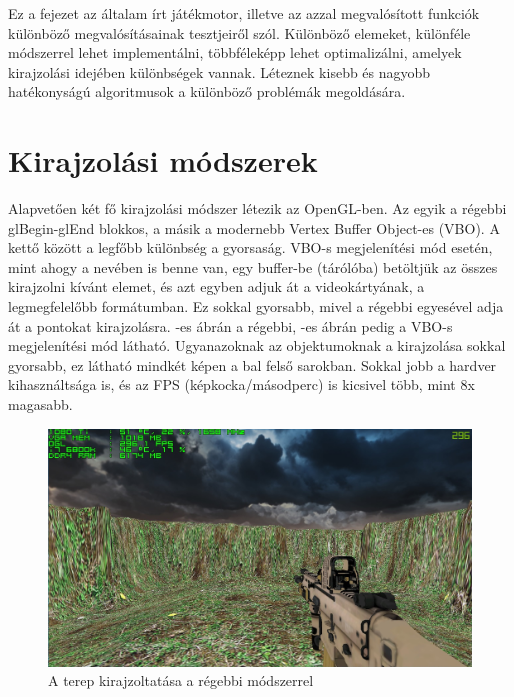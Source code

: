 \label{Chap:tesztek}


Ez a fejezet az általam írt játékmotor, illetve az azzal megvalósított funkciók különböző megvalósításainak tesztjeiről szól. Különböző elemeket, különféle módszerrel lehet implementálni, többféleképp lehet optimalizálni, amelyek kirajzolási idejében különbségek vannak. Léteznek kisebb és nagyobb hatékonyságú algoritmusok a különböző problémák megoldására.

\section{Kirajzolási módszerek}

Alapvetően két fő kirajzolási módszer létezik az OpenGL-ben. Az egyik a régebbi glBegin-glEnd blokkos, a másik a modernebb Vertex Buffer Object-es (VBO). A kettő között a legfőbb különbség a gyorsaság. VBO-s megjelenítési mód esetén, mint ahogy a nevében is benne van, egy buffer-be (tárólóba) betöltjük az összes kirajzolni kívánt elemet, és azt egyben adjuk át a videokártyának, a legmegfelelőbb formátumban. Ez sokkal gyorsabb, mivel a régebbi egyesével adja át a pontokat kirajzolásra. -es ábrán a régebbi, -es  ábrán pedig a VBO-s megjelenítési mód látható. Ugyanazoknak az objektumoknak a kirajzolása sokkal gyorsabb, ez látható mindkét képen a bal felső sarokban. Sokkal jobb a hardver kihasználtsága is, és az FPS (képkocka/másodperc) is kicsivel több, mint 8x magasabb.

\begin{figure}[h]
\centering
\includegraphics[scale=0.35]{kepek/old_method_fps.png}
\caption{A terep kirajzoltatása a régebbi módszerrel}
\label{fig:old_fps}
\end{figure}

